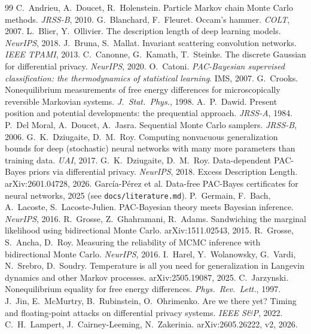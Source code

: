 \documentclass[11pt]{article}
\theoremstyle{definition}
\theoremstyle{remark}
\begin{document}
\begin{thebibliography}{99}\small
{} C.~Andrieu, A.~Doucet, R.~Holenstein. Particle Markov chain Monte Carlo methods. \emph{JRSS-B}, 2010.
 G.~Blanchard, F.~Fleuret. Occam's hammer. \emph{COLT}, 2007.
 L.~Blier, Y.~Ollivier. The description length of deep learning models. \emph{NeurIPS}, 2018.
 J.~Bruna, S.~Mallat. Invariant scattering convolution networks. \emph{IEEE TPAMI}, 2013.
 C.~Canonne, G.~Kamath, T.~Steinke. The discrete Gaussian for differential privacy. \emph{NeurIPS}, 2020.
 O.~Catoni. \emph{PAC-Bayesian supervised classification: the thermodynamics of statistical learning}. IMS, 2007.
 G.~Crooks. Nonequilibrium measurements of free energy differences for microscopically reversible Markovian systems. \emph{J.\ Stat.\ Phys.}, 1998.
 A.~P.~Dawid. Present position and potential developments: the prequential approach. \emph{JRSS-A}, 1984.
 P.~Del Moral, A.~Doucet, A.~Jasra. Sequential Monte Carlo samplers. \emph{JRSS-B}, 2006.
 G.~K.~Dziugaite, D.~M.~Roy. Computing nonvacuous generalization bounds for deep (stochastic) neural networks with many more parameters than training data. \emph{UAI}, 2017.
 G.~K.~Dziugaite, D.~M.~Roy. Data-dependent PAC-Bayes priors via differential privacy. \emph{NeurIPS}, 2018.
 Excess Description Length. arXiv:2601.04728, 2026.
 Garc\'ia-P\'erez et al. Data-free PAC-Bayes certificates for neural networks, 2025 (see \texttt{docs/literature.md}).
 P.~Germain, F.~Bach, A.~Lacoste, S.~Lacoste-Julien. PAC-Bayesian theory meets Bayesian inference. \emph{NeurIPS}, 2016.
 R.~Grosse, Z.~Ghahramani, R.~Adams. Sandwiching the marginal likelihood using bidirectional Monte Carlo. arXiv:1511.02543, 2015.
 R.~Grosse, S.~Ancha, D.~Roy. Measuring the reliability of MCMC inference with bidirectional Monte Carlo. \emph{NeurIPS}, 2016.
 I.~Harel, Y.~Wolanowsky, G.~Vardi, N.~Srebro, D.~Soudry. Temperature is all you need for generalization in Langevin dynamics and other Markov processes. arXiv:2505.19087, 2025.
 C.~Jarzynski. Nonequilibrium equality for free energy differences. \emph{Phys.\ Rev.\ Lett.}, 1997.
 J.~Jin, E.~McMurtry, B.~Rubinstein, O.~Ohrimenko. Are we there yet? Timing and floating-point attacks on differential privacy systems. \emph{IEEE S\&P}, 2022.
 C.~H.~Lampert, J.~Cairney-Leeming, N.~Zakerinia. arXiv:2605.26222, v2, 2026.

\end{thebibliography}
\end{document}

